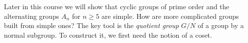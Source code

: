 \documentclass[reqno,11pt]{amsart}
\begin{document}
Later in this course we will show that cyclic groups of prime order and
the alternating groups $A_n$ for $n\geq5$ are simple. How are more
complicated groups built from simple ones? The key tool is the
\emph{quotient group} $G/N$ of a group by a normal subgroup. To construct
it, we first need the notion of a coset.
\end{document}
